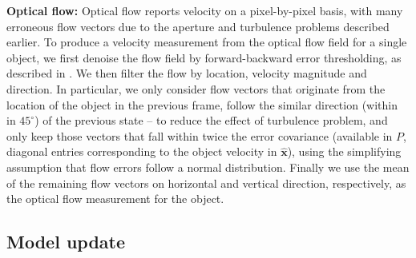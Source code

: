 \textbf{Optical flow:}  
Optical flow reports velocity on a pixel-by-pixel basis, with many erroneous flow vectors due to the aperture and turbulence problems described earlier. To produce a velocity measurement from the optical flow field for a single object, we first denoise the flow field by forward-backward error thresholding, as described in \cite{kalal2010forward}. We then filter the flow by location, velocity magnitude and direction. In particular, we only consider flow vectors that originate from the location of the object in the previous frame, follow the similar direction (within in $45^\circ$) of the previous state -- to reduce the effect of turbulence problem, and only keep those vectors that fall within twice the error covariance 
(available in $P$, diagonal entries corresponding to the object velocity in $\mathbf{\hat x}$), using the simplifying assumption that flow errors follow a normal distribution. 
%
Finally we use the mean of the remaining flow vectors on horizontal and vertical direction, respectively, as the optical flow measurement for the object. 

\subsection{Model update}

